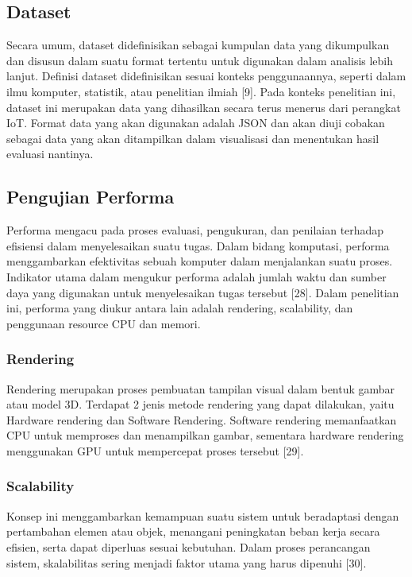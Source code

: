 \subsection{Dataset}
Secara umum, dataset didefinisikan sebagai kumpulan data yang dikumpulkan dan disusun dalam suatu format tertentu untuk digunakan dalam analisis lebih lanjut. Definisi dataset didefinisikan sesuai konteks penggunaannya, seperti dalam ilmu komputer, statistik, atau penelitian ilmiah [9]. Pada konteks penelitian ini, dataset ini merupakan data yang dihasilkan secara terus menerus dari perangkat IoT. Format data yang akan digunakan adalah JSON dan akan diuji cobakan sebagai data yang akan ditampilkan dalam visualisasi dan menentukan hasil evaluasi nantinya. 

\subsection{Pengujian Performa}
Performa mengacu pada proses evaluasi, pengukuran, dan penilaian terhadap efisiensi dalam menyelesaikan suatu tugas. Dalam bidang komputasi, performa menggambarkan efektivitas sebuah komputer dalam menjalankan suatu proses. Indikator utama dalam mengukur performa adalah jumlah waktu dan sumber daya yang digunakan untuk menyelesaikan tugas tersebut [28]. Dalam penelitian ini, performa yang diukur antara lain adalah rendering, scalability, dan penggunaan resource CPU dan memori. 

\subsubsection{Rendering}
Rendering merupakan proses pembuatan tampilan visual dalam bentuk gambar atau model 3D. Terdapat 2 jenis metode rendering yang dapat dilakukan, yaitu Hardware rendering dan Software Rendering. Software rendering memanfaatkan CPU untuk memproses dan menampilkan gambar, sementara hardware rendering menggunakan GPU untuk mempercepat proses tersebut [29].

\subsubsection{Scalability}
Konsep ini menggambarkan kemampuan suatu sistem untuk beradaptasi dengan pertambahan elemen atau objek, menangani peningkatan beban kerja secara efisien, serta dapat diperluas sesuai kebutuhan. Dalam proses perancangan sistem, skalabilitas sering menjadi faktor utama yang harus dipenuhi [30].


